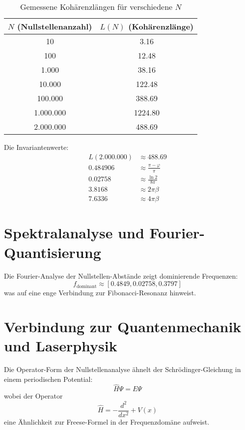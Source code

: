 \documentclass[a4paper,12pt]{article}
\begin{document}
\begin{table}[h]
    \centering
    \begin{tabular}{c|c}
    \toprule
    \( N \) (Nullstellenanzahl) & \( L(N) \) (Kohärenzlänge) \\
    \midrule
    10       & 3.16  \\
    100      & 12.48 \\
    1.000    & 38.16 \\
    10.000   & 122.48 \\
    100.000  & 388.69 \\
    1.000.000 & 1224.80 \\
    2.000.000 & 488.69  \\
    \bottomrule
    \end{tabular}
    \caption{Gemessene Kohärenzlängen für verschiedene \( N \)}
\end{table}

Die Invariantenwerte:
\begin{align}
L(2.000.000) &\approx 488.69 \\
0.484906 &\approx \frac{\pi - \varphi}{\pi} \\
0.02758  &\approx \frac{\ln 2}{8\pi} \\
3.8168   &\approx 2\pi \beta \\
7.6336   &\approx 4\pi \beta
\end{align}

\section{Spektralanalyse und Fourier-Quantisierung}
Die Fourier-Analyse der Nullstellen-Abstände zeigt dominierende Frequenzen:
\begin{equation}
f_{\text{dominant}} \approx [0.4849, 0.02758, 0.3797]
\end{equation}
was auf eine enge Verbindung zur Fibonacci-Resonanz hinweist.

\section{Verbindung zur Quantenmechanik und Laserphysik}
Die Operator-Form der Nullstellenanalyse ähnelt der Schrödinger-Gleichung in einem periodischen Potential:
\begin{equation}
\hat{H} \Psi = E \Psi
\end{equation}
wobei der Operator
\begin{equation}
\hat{H} = -\frac{d^2}{dx^2} + V(x)
\end{equation}
eine Ähnlichkeit zur Freese-Formel in der Frequenzdomäne aufweist.
\end{document}
